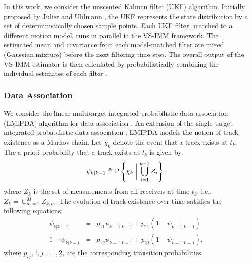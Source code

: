 \documentclass[times]{asjcauth}
\begin{document}
In this work, we consider the unscented Kalman filter (UKF) algorithm. Initially proposed by Julier and Uhlmann \cite{ukf}, the UKF represents the state distribution by a set of deterministically chosen sample points. Each UKF filter, matched to a different motion model, runs in parallel in the VS-IMM framework. The estimated mean and covariance from each model-matched filter are mixed (Gaussian mixture) before the next filtering time step. The overall output of the VS-IMM estimator is then calculated by probabilistically combining the individual estimates of each filter \cite{kim2004imm}.

\subsubsection{Data Association}
\label{secdatassoc}

We consider the linear multitarget integrated probabilistic data association (LMIPDA) algorithm for data association \cite{suv1,suv2}. An extension of the single-target integrated probabilistic data association \cite{IPDA}, LMIPDA models the notion of track existence as a Markov chain. Let $\chi_{k}$ denote the event that a track exists at $t_{k}$. The a priori probability that a track exists at $t_{k}$ is given by:
\begin{equation*}
\psi_{k|k-1}\triangleq\mathrm{P}\left\{\chi_{k}\biggm|\bigcup_{i=1}^{k-1}Z_{i}\right\},
\end{equation*}
where $Z_{k}$ is the set of measurements from all receivers at time $t_{k}$, i.e., $Z_{k} = \cup_{m=1}^{M}Z_{k,m}$. The evolution of track existence over time satisfies the following equations:
\begin{eqnarray*}
\psi_{k|k-1}& = &p_{11}\psi_{k-1|k-1} + p_{21}\left(1-\psi_{k-1|k-1}\right)\\
1-\psi_{k|k-1}& = &p_{12}\psi_{k-1|k-1} +
p_{22}\left(1-\psi_{k-1|k-1}\right),
\end{eqnarray*}
\noindent where $p_{ij}$, $i,j=1,2$, are the corresponding transition probabilities.
\end{document}
